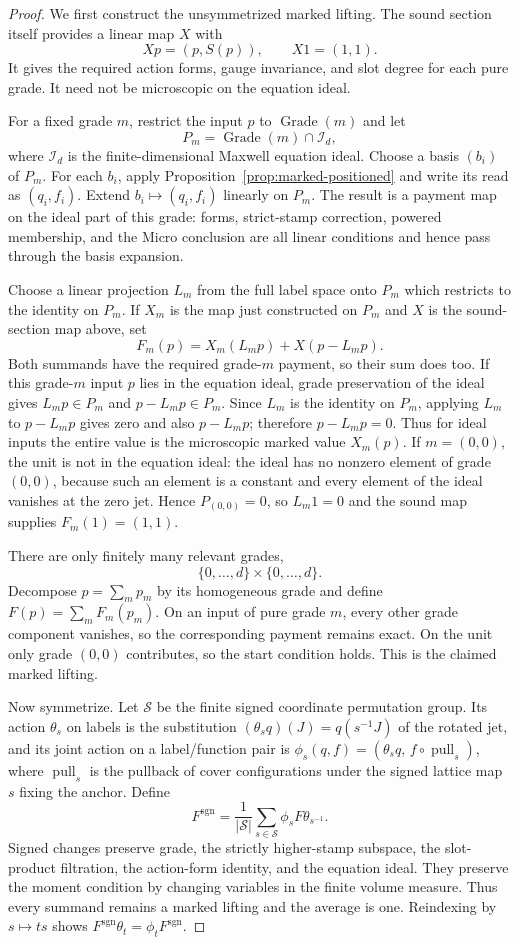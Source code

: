 \begin{proof}
We first construct the unsymmetrized marked lifting. The sound section itself
provides a linear map $X$ with
\[
 Xp=(p,S(p)),\qquad X1=(1,1).
\]
It gives the required action forms, gauge invariance, and slot degree for
each pure grade. It need not be microscopic on the equation ideal.

For a fixed grade $m$, restrict the input $p$ to $\operatorname{Grade}(m)$
and let
\[
 P_m=\operatorname{Grade}(m)\cap\mathcal I_d,
\]
where $\mathcal I_d$ is the finite-dimensional Maxwell equation ideal.
Choose a basis $(b_i)$ of $P_m$. For each $b_i$, apply
Proposition~\ref{prop:marked-positioned} and write its read as
$(q_i,f_i)$. Extend $b_i\mapsto(q_i,f_i)$ linearly on $P_m$. The result
is a payment map on the ideal part of this grade: forms, strict-stamp
correction, powered membership, and the Micro conclusion are all linear
conditions and hence pass through the basis expansion.

Choose a linear projection $L_m$ from the full label space onto $P_m$
which restricts to the identity on $P_m$. If $X_m$ is the map just
constructed on $P_m$ and $X$ is the sound-section map above, set
\[
                 F_m(p)=X_m(L_mp)+X(p-L_mp).
\]
Both summands have the required grade-$m$ payment, so their sum does too.
If this grade-$m$ input $p$ lies in the equation ideal, grade preservation
of the ideal gives $L_mp\in P_m$ and $p-L_mp\in P_m$. Since $L_m$ is the
identity on $P_m$, applying $L_m$
to $p-L_mp$ gives zero and also $p-L_mp$; therefore $p-L_mp=0$.
Thus for ideal inputs the entire value is the microscopic marked value
$X_m(p)$. If $m=(0,0)$, the unit is not in the equation ideal: the ideal
has no nonzero element of grade $(0,0)$, because such an element
is a constant and every element of the ideal vanishes at the zero jet.
Hence $P_{(0,0)}=0$, so $L_m1=0$ and the sound map
supplies $F_m(1)=(1,1)$.

There are only finitely many relevant grades,
\[
             \{0,\ldots,d\}\times\{0,\ldots,d\}.
\]
Decompose $p=\sum_m p_m$ by its homogeneous grade and define
$F(p)=\sum_mF_m(p_m)$. On an input of pure grade $m$, every other grade
component vanishes, so the corresponding payment remains exact. On the
unit only grade $(0,0)$ contributes, so the start condition holds. This
is the claimed marked lifting.

Now symmetrize. Let $\mathcal S$ be the finite signed coordinate
permutation group. Its action $\theta_s$ on labels is the substitution
$(\theta_sq)(J)=q(s^{-1}J)$ of the rotated jet, and its
joint action on a label/function pair is
$\phi_s(q,f)=(\theta_sq,\,f\circ\operatorname{pull}_s)$, where
$\operatorname{pull}_s$ is the pullback of cover configurations under
the signed lattice map $s$ fixing the anchor. Define
\[
 F^{\mathrm{sgn}}=\frac1{|\mathcal S|}
       \sum_{s\in\mathcal S}\phi_s F\theta_{s^{-1}}.
\]
Signed changes preserve grade, the strictly higher-stamp subspace, the
slot-product filtration, the action-form identity, and the equation ideal.
They preserve the moment condition by changing variables in the finite
volume measure. Thus every summand remains a marked lifting and the average is
one. Reindexing by $s\mapsto ts$ shows
$F^{\mathrm{sgn}}\theta_t=\phi_tF^{\mathrm{sgn}}$.


\end{proof}
